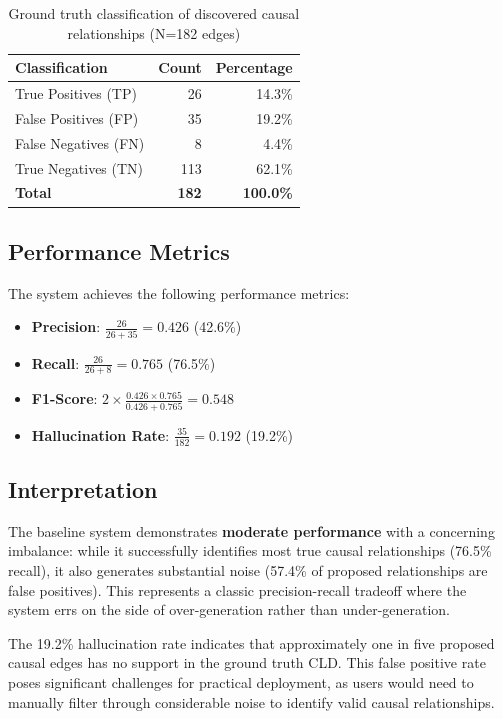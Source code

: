 \begin{table}[h]
\centering
\begin{tabular}{lrr}
\toprule
\textbf{Classification} & \textbf{Count} & \textbf{Percentage} \\
\midrule
True Positives (TP) & 26 & 14.3\% \\
False Positives (FP) & 35 & 19.2\% \\
False Negatives (FN) & 8 & 4.4\% \\
True Negatives (TN) & 113 & 62.1\% \\
\midrule
\textbf{Total} & \textbf{182} & \textbf{100.0\%} \\
\bottomrule
\end{tabular}
\caption{Ground truth classification of discovered causal relationships (N=182 edges)}
\label{tab:baseline_classification}
\end{table}

\subsection{Performance Metrics}

The system achieves the following performance metrics:

\begin{itemize}
    \item \textbf{Precision}: $\frac{26}{26+35} = 0.426$ (42.6\%)
    \item \textbf{Recall}: $\frac{26}{26+8} = 0.765$ (76.5\%)
    \item \textbf{F1-Score}: $2 \times \frac{0.426 \times 0.765}{0.426 + 0.765} = 0.548$
    \item \textbf{Hallucination Rate}: $\frac{35}{182} = 0.192$ (19.2\%)
\end{itemize}

\subsection{Interpretation}

The baseline system demonstrates \textbf{moderate performance} with a concerning imbalance: while it successfully identifies most true causal relationships (76.5\% recall), it also generates substantial noise (57.4\% of proposed relationships are false positives). This represents a classic precision-recall tradeoff where the system errs on the side of over-generation rather than under-generation.

The 19.2\% hallucination rate indicates that approximately one in five proposed causal edges has no support in the ground truth CLD. This false positive rate poses significant challenges for practical deployment, as users would need to manually filter through considerable noise to identify valid causal relationships.

